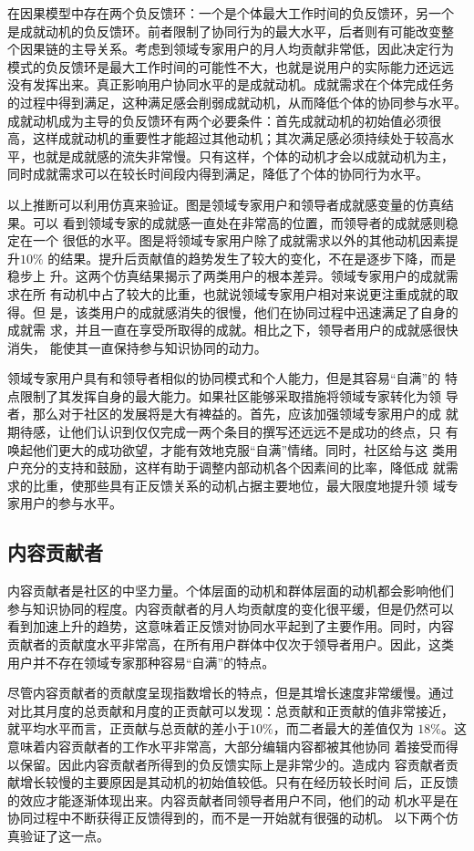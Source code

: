 在因果模型中存在两个负反馈环：一个是个体最大工作时间的负反馈环，另一个
是成就动机的负反馈环。前者限制了协同行为的最大水平，后者则有可能改变整
个因果链的主导关系。考虑到领域专家用户的月人均贡献非常低，因此决定行为
模式的负反馈环是最大工作时间的可能性不大，也就是说用户的实际能力还远远
没有发挥出来。真正影响用户协同水平的是成就动机。成就需求在个体完成任务
的过程中得到满足，这种满足感会削弱成就动机，从而降低个体的协同参与水平。
成就动机成为主导的负反馈环有两个必要条件：首先成就动机的初始值必须很
高，这样成就动机的重要性才能超过其他动机；其次满足感必须持续处于较高水
平，也就是成就感的流失非常慢。只有这样，个体的动机才会以成就动机为主，
同时成就需求可以在较长时间段内得到满足，降低了个体的协同行为水平。 

以上推断可以利用仿真来验证。图是领域专家用户和领导者成就感变量的仿真结果。可以
看到领域专家的成就感一直处在非常高的位置，而领导者的成就感则稳定在一个
很低的水平。图是将领域专家用户除了成就需求以外的其他动机因素提升$10\%$
的结果。提升后贡献值的趋势发生了较大的变化，不在是逐步下降，而是稳步上
升。这两个仿真结果揭示了两类用户的根本差异。领域专家用户的成就需求在所
有动机中占了较大的比重，也就说领域专家用户相对来说更注重成就的取得。但
是，该类用户的成就感消失的很慢，他们在协同过程中迅速满足了自身的成就需
求，并且一直在享受所取得的成就。相比之下，领导者用户的成就感很快消失，
能使其一直保持参与知识协同的动力。

领域专家用户具有和领导者相似的协同模式和个人能力，但是其容易“自满”的
特点限制了其发挥自身的最大能力。如果社区能够采取措施将领域专家转化为领
导者，那么对于社区的发展将是大有裨益的。首先，应该加强领域专家用户的成
就期待感，让他们认识到仅仅完成一两个条目的撰写还远远不是成功的终点，只
有唤起他们更大的成功欲望，才能有效地克服“自满”情绪。同时，社区给与这
类用户充分的支持和鼓励，这样有助于调整内部动机各个因素间的比率，降低成
就需求的比重，使那些具有正反馈关系的动机占据主要地位，最大限度地提升领
域专家用户的参与水平。

\subsection{内容贡献者}

内容贡献者是社区的中坚力量。个体层面的动机和群体层面的动机都会影响他们
参与知识协同的程度。内容贡献者的月人均贡献度的变化很平缓，但是仍然可以
看到加速上升的趋势，这意味着正反馈对协同水平起到了主要作用。同时，内容
贡献者的贡献度水平非常高，在所有用户群体中仅次于领导者用户。因此，这类
用户并不存在领域专家那种容易“自满”的特点。

尽管内容贡献者的贡献度呈现指数增长的特点，但是其增长速度非常缓慢。通过
对比其月度的总贡献和月度的正贡献可以发现：总贡献和正贡献的值非常接近，
就平均水平而言，正贡献与总贡献的差小于$10\%$，而二者最大的差值仅为
$18\%$。这意味着内容贡献者的工作水平非常高，大部分编辑内容都被其他协同
着接受而得以保留。因此内容贡献者所得到的负反馈实际上是非常少的。造成内
容贡献者贡献增长较慢的主要原因是其动机的初始值较低。只有在经历较长时间
后，正反馈的效应才能逐渐体现出来。内容贡献者同领导者用户不同，他们的动
机水平是在协同过程中不断获得正反馈得到的，而不是一开始就有很强的动机。
以下两个仿真验证了这一点。

